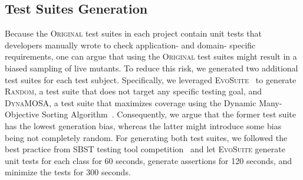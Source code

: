 \documentclass[sigconf,review,anonymous]{acmart}
\newcommand{\Evosuite}{\textsc{EvoSuite}\xspace}
\newcommand{\original}{\textsc{Original}\xspace}
\newcommand{\EvosuiteRandom}{\textsc{Random}\xspace}
\newcommand{\EvosuiteDynamosa}{\textsc{DynaMOSA}\xspace}
\begin{document}
\subsection{Test Suites Generation}
\label{sec:testgeneration}
%
%
Because the \original test suites in each project contain unit tests
that developers manually wrote to check application- and
domain- specific requirements, one can argue that using
the \original test suites %
might result in a biased sampling of live mutants.
%
To reduce this risk,
we generated two additional test suites for each test subject.
%
Specifically, we leveraged \Evosuite~\cite{fraser2011evosuite}
to generate \EvosuiteRandom, a test suite that does not target any specific testing goal,
and \EvosuiteDynamosa, a test suite that maximizes coverage using the Dynamic Many-Objective Sorting Algorithm~\cite{panichella2015reformulating}.
Consequently, we argue that the former test suite has the lowest generation bias, whereas
the latter might introduce some bias being not completely random.
%
For generating both test suites, we followed the best practice from
SBST testing tool competition~\cite{devroey2020java,panichella2021sbst,DBLP:conf/sbst/GambiJRZ22}
and let \Evosuite generate unit tests for each class for 60 seconds,
generate assertions for 120 seconds, and minimize the tests for 300 seconds.

%
%
\end{document}

